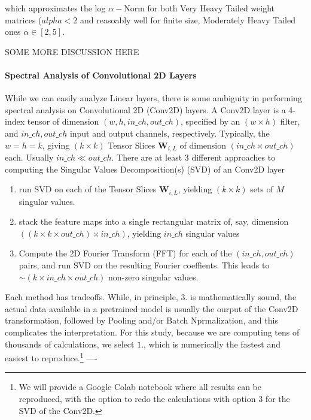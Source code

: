 which approximates the log $\alpha-$Norm for both Very Heavy Tailed weight matrices ($alpha < 2$  and reasoably well for finite size, Moderately Heavy Tailed ones $\alpha\in[2,5]$.  


SOME MORE DISCUSSION HERE


\paragraph{Spectral Analysis of Convolutional 2D Layers}
While we can easily analyze Linear layers, there is some ambiguity in performing spectral analysis on Convolutional 2D (Conv2D) layers.  A Conv2D layer is a 4-index tensor of dimension $(w,h,in\_ch,out\_ch)$, specified by an $(w\times h)$ filter, and $in\_ch,out\_ch$ input and output channels, respectively.  Typically, the $w=h=k$,  giving $(k\times k)$ Tensor Slices $\mathbf{W}_{i,L}$
of dimension $(in\_ch\times out\_ch)$ each.  Usually $in\_ch\ll out\_ch$.
There are at least 3 different approaches to computing the Singular Values Decomposition(s) (SVD) of an Conv2D layer
\begin{enumerate}
\item run SVD on each of the Tensor Slices $\mathbf{W}_{i,L}$, yielding $(k\times k)$ sets of $M$ singular values. 
\item stack the feature maps into a single rectangular matrix of, say, dimension $((k\times k\times out\_ch)\times in\_ch)$, yielding $in\_ch$ singular values
\item Compute the 2D Fourier Transform (FFT) for each of the $(in\_ch, out\_ch)$ pairs, and run SVD on the resulting Fourier coeffients\cite{Long2019}.  This leads to $\sim(k\times in\_ch\times out\_ch)$ non-zero singular values.
\end{enumerate}

Each method has tradeoffs.  While, in principle, 3. is mathematically sound, the actual data available
in a pretrained model is usually the ourput of the Conv2D transformation, followed by Pooling and/or Batch Nprmalization,
and this complicates the interpretation.  For this study, because we are computing tens of thousands of calculations,  
we select $1.$, which is numerically the fastest and easiest to reproduce.\footnote{We will provide a Google Colab notebook where all results can be reproduced, with the option to redo the calculations with option 3 for the SVD of the Conv2D.}
----








